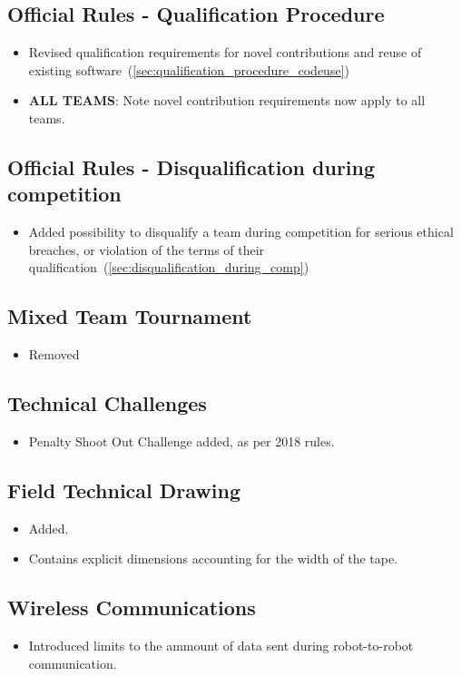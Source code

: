 \subsection*{Official Rules - Qualification Procedure}
\begin{itemize}
  \item Revised qualification requirements for novel contributions and reuse of existing software~(\cf \cref{sec:qualification_procedure_codeuse})
  \item \textbf{ALL TEAMS}: Note novel contribution requirements now apply to all teams.
\end{itemize}


\subsection*{Official Rules - Disqualification during competition}
\begin{itemize}
  \item Added possibility to disqualify a team during competition for serious ethical breaches, or violation of the terms of their qualification~(\cf \cref{sec:disqualification_during_comp})
\end{itemize}

\subsection*{Mixed Team Tournament}
\begin{itemize}
  \item Removed
\end{itemize}

\subsection*{Technical Challenges}
\begin{itemize}
  \item Penalty Shoot Out Challenge added, as per 2018 rules.
\end{itemize}

\subsection*{Field Technical Drawing}
\begin{itemize}
  \item Added.
  \item Contains explicit dimensions accounting for the width of the tape.
\end{itemize}

\subsection*{Wireless Communications}
\begin{itemize}
  \item Introduced limits to the ammount of data sent during robot-to-robot communication.
\end{itemize}
